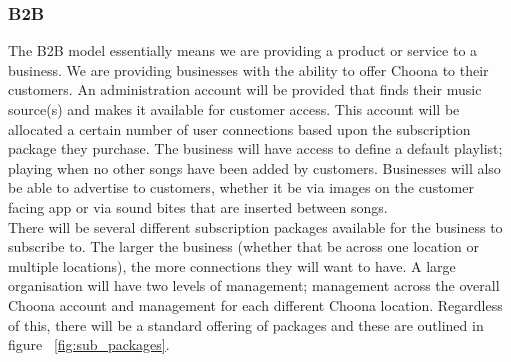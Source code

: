 \subsubsection{B2B}
The B2B model essentially means we are providing a product or service to a business.  We are providing businesses with the ability to offer Choona to their customers.  An administration account will be provided that finds their music source(s) and makes it available for customer access.  This account will be allocated a certain number of user connections based upon the subscription package they purchase.  The business will have access to define a default playlist; playing when no other songs have been added by customers.  Businesses will also be able to advertise to customers, whether it be via images on the customer facing app or via sound bites that are inserted between songs.  \\
There will be several different subscription packages available for the business to subscribe to.  The larger the business (whether that be across one location or multiple locations), the more connections they will want to have.  A large organisation will have two levels of management; management across the overall Choona account and management for each different Choona location.  Regardless of this, there will be a standard offering of packages and these are outlined in figure ~\ref{fig:sub_packages}.  \\

\noindent{}\\

